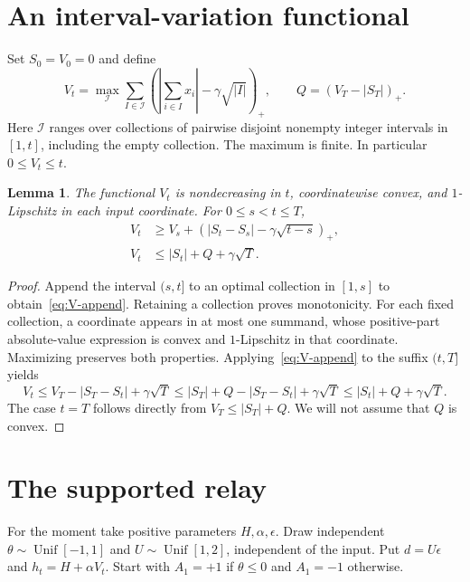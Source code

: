 \documentclass[11pt]{article}
\newtheorem{lemma}[theorem]{Lemma}
\theoremstyle{remark}\newtheorem{remark}[theorem]{Remark}
\begin{document}
\section{An interval-variation functional}\label{sec:functional}
Set $S_0=V_0=0$ and define
\begin{equation}\label{eq:V-definition}
 V_t=\max_{\mathcal I}
 \sum_{I\in\mathcal I}
 \left(\left|\sum_{i\in I}x_i\right|-\gamma\sqrt{|I|}\right)_+,
 \qquad Q=(V_T-|S_T|)_+.
\end{equation}
Here $\mathcal I$ ranges over collections of pairwise disjoint nonempty
integer intervals in $[1,t]$, including the empty collection. The
maximum is finite. In particular $0\le V_t\le t$.

\begin{lemma}\label{lem:V-properties}
The functional $V_t$ is nondecreasing in $t$, coordinatewise convex,
and $1$-Lipschitz in each input coordinate. For $0\le s<t\le T$,
\begin{align}
 V_t&\ge V_s+(|S_t-S_s|-\gamma\sqrt{t-s})_+,
 \label{eq:V-append}\\
 V_t&\le |S_t|+Q+\gamma\sqrt T.\label{eq:V-prefix}
\end{align}
\end{lemma}
\begin{proof}
Append the interval $(s,t]$ to an optimal collection in $[1,s]$ to
obtain~\eqref{eq:V-append}. Retaining a collection proves monotonicity.
For each fixed collection, a coordinate appears in at most one
summand, whose positive-part absolute-value expression is convex and
$1$-Lipschitz in that coordinate. Maximizing preserves both properties.
Applying~\eqref{eq:V-append} to the suffix $(t,T]$ yields
\[
 V_t\le V_T-|S_T-S_t|+\gamma\sqrt T
 \le |S_T|+Q-|S_T-S_t|+\gamma\sqrt T
 \le |S_t|+Q+\gamma\sqrt T.
\]
The case $t=T$ follows directly from $V_T\le|S_T|+Q$.
We will not assume that $Q$ is convex.
\end{proof}

\section{The supported relay}\label{sec:relay}
For the moment take positive parameters $H,\alpha,\epsilon$.
Draw independent $\theta\sim\operatorname{Unif}[-1,1]$ and
$U\sim\operatorname{Unif}[1,2]$, independent of the input. Put
$d=U\epsilon$ and $h_t=H+\alpha V_t$. Start with $A_1=+1$ if
$\theta\le0$ and $A_1=-1$ otherwise.
\end{document}
